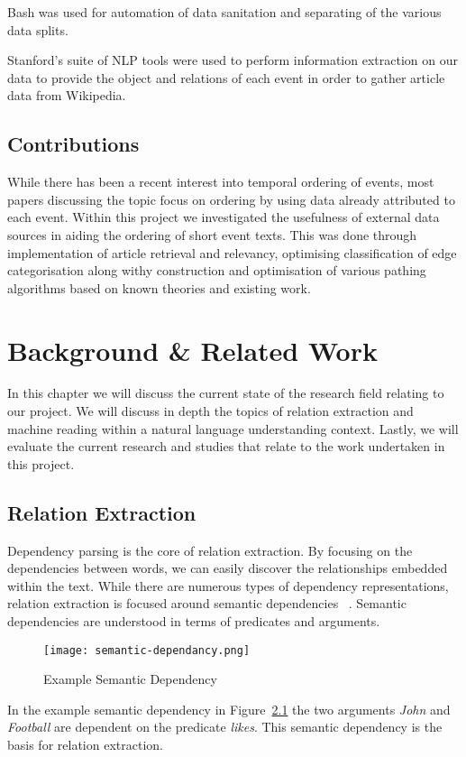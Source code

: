 \documentclass[bsc,frontabs,twoside,singlespacing,parskip,deptreport]{infthesis}     %
\begin{document}
Bash was used for automation of data sanitation and separating of the various data splits. 

Stanford's suite of NLP tools were used to perform information extraction on our data to provide the
object and relations of each event in order to gather article data from Wikipedia.
\section{Contributions}
While there has been a recent interest into temporal ordering of events, most papers discussing the topic focus on
ordering by using data already attributed to each event. Within this project we investigated the usefulness of
external data sources in aiding the ordering of short event texts. This was done through implementation
of article retrieval and relevancy, optimising classification of edge categorisation along withy construction and optimisation
of various pathing algorithms based on known theories and existing work. 
\chapter{Background \& Related Work}\label{chapter:backgroundandrelatework}
In this chapter we will discuss the current state of the research field relating to our project.
We will discuss in depth the topics of relation extraction and machine reading within a natural language understanding
context. Lastly, we will evaluate the current research and studies that relate to the work undertaken in this project.

\section{Relation Extraction}\label{sec:IE-bg}
Dependency parsing is the core of relation extraction.
By focusing on the dependencies between words, we can easily discover the relationships embedded within the text.
While there are numerous types of dependency representations, relation extraction is focused around semantic dependencies ~\cite{mcclosky2011event}.
Semantic dependencies are understood in terms of predicates and arguments.
\begin{figure}[H]
  \centering
  \texttt{[image: semantic-dependancy.png]}
  \caption{Example Semantic Dependency}
  \label{fig:semantic-dependancy}
\end{figure}

In the example semantic dependency in Figure~\ref{fig:semantic-dependancy} the two arguments \textit{John} and \textit{Football} are dependent
on the predicate \textit{likes}. This semantic dependency is the basis for relation extraction.
\end{document}
